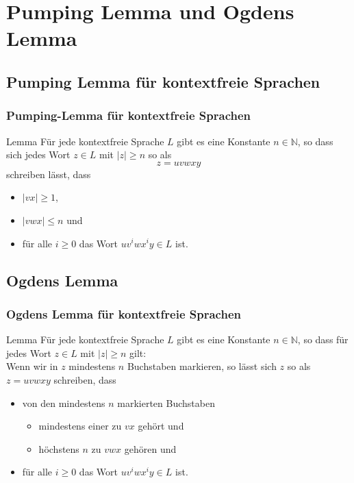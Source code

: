 

\section{Pumping Lemma und Ogdens Lemma}
\subsection{Pumping Lemma für kontextfreie Sprachen}
\begin{frame}
\frametitle{Pumping-Lemma für kontextfreie Sprachen}
\begin{exampleblock}{Lemma}
Für jede kontextfreie Sprache $L$ gibt es eine Konstante $n \in \mathbb{N}$,
so dass sich jedes Wort $z \in L$ mit $|z| \geq n$ so als
$$ z = uvwxy $$
schreiben lässt, dass
\begin{itemize}
\item $|vx| \geq 1$,
\item $|vwx| \leq n$ und
\item für alle $i \geq 0$ das Wort $uv^iwx^iy \in L$ ist.
\end{itemize}
\end{exampleblock}
\end{frame}

\subsection{Ogdens Lemma}
\begin{frame}
\frametitle{Ogdens Lemma für kontextfreie Sprachen}
\begin{exampleblock}{Lemma}
Für jede kontextfreie Sprache $L$
gibt es eine Konstante $n \in \mathbb{N}$, so dass für jedes Wort $z \in L$ mit $|z| \geq n$ gilt:\\
Wenn wir in $z$ mindestens $n$ Buchstaben markieren, so lässt sich $z$ so als $z = uvwxy$ schreiben, dass
\begin{itemize}
\item von den mindestens $n$ markierten Buchstaben
\begin{itemize}
\item mindestens einer zu $vx$ gehört und
\item höchstens $n$ zu $vwx$ gehören und
\end{itemize}
\item für alle $i \geq 0$ das Wort $uv^iwx^iy \in L$ ist.
\end{itemize}
\end{exampleblock}
\end{frame}

